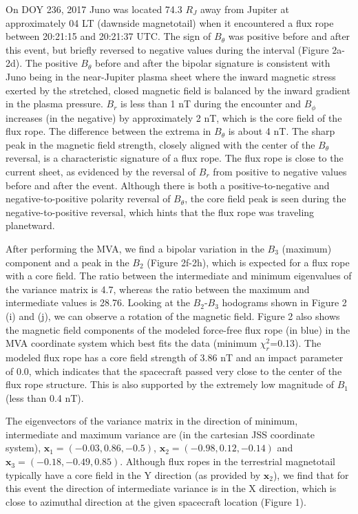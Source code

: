 On DOY 236, 2017 Juno was located 74.3 $R_J$ away from Jupiter at approximately 04 LT (dawnside magnetotail) when it encountered a flux rope between 20:21:15 and 20:21:37 UTC. The sign of $B_\theta$ was positive before and after this event, but briefly reversed to negative values during the interval (Figure 2a-2d). The positive $B_\theta$ before and after the bipolar signature is consistent with Juno being in the near-Jupiter plasma sheet where the inward magnetic stress exerted by the stretched, closed magnetic field is balanced by the inward gradient in the plasma pressure.  $B_r$ is less than 1 nT during the encounter and $B_\phi$ increases (in the negative) by approximately 2 nT, which is the core field of the flux rope. The difference between the extrema in $B_\theta$ is about 4 nT. The sharp peak in the magnetic field strength, closely aligned with the center of the $B_\theta$ reversal, is a characteristic signature of a flux rope. The flux rope is close to the current sheet, as evidenced by the reversal of $B_r$ from positive to negative values before and after the event. Although there is both a positive-to-negative and negative-to-positive polarity reversal of $B_\theta$, the core field peak is seen during the negative-to-positive reversal, which hints that the flux rope was traveling planetward.

After performing the MVA, we find a bipolar variation in the $B_3$ (maximum) component and a peak in the $B_2$ (Figure 2f-2h), which is expected for a flux rope with a core field. The ratio between the intermediate and minimum eigenvalues of the variance matrix is 4.7, whereas the ratio between the maximum and intermediate values is 28.76. Looking at the $B_2$-$B_3$ hodograms shown in Figure 2 (i) and (j), we can observe a rotation of the magnetic field. Figure 2 also shows the magnetic field components of the modeled force-free flux rope (in blue) in the MVA coordinate system which best fits the data (minimum $\chi_r^2$=0.13). The modeled flux rope has a core field strength of 3.86 nT and an impact parameter of 0.0, which indicates that the spacecraft passed very close to the center of the flux rope structure. This is also supported by the extremely low magnitude of $B_1$ (less than 0.4 nT). 

The eigenvectors of the variance matrix in the direction of minimum, intermediate and maximum variance are (in the cartesian JSS coordinate system), $\mathbf{x}_1 =(-0.03,0.86,-0.5)$, $\mathbf{x}_2=(-0.98,0.12,-0.14)$ and $\mathbf{x}_3=(-0.18,-0.49,0.85)$. Although flux ropes in the terrestrial magnetotail typically have a core field in the Y direction (as provided by $\mathbf{x}_2$), we find that for this event the direction of intermediate variance is in the X direction, which is close to azimuthal direction at the given spacecraft location (Figure 1). 

